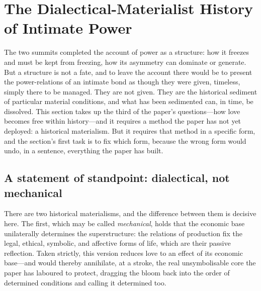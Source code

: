 \section{The Dialectical-Materialist History of Intimate Power}
\label{p17:sec:histmat}

\noindent
The two summits completed the account of power as a structure: how it freezes and must be kept from freezing, how its asymmetry can dominate or generate. But a structure is not a fate, and to leave the account there would be to present the power-relations of an intimate bond as though they were given, timeless, simply there to be managed. They are not given. They are the historical sediment of particular material conditions, and what has been sedimented can, in time, be dissolved. This section takes up the third of the paper's questions---how love becomes free within history---and it requires a method the paper has not yet deployed: a historical materialism. But it requires that method in a specific form, and the section's first task is to fix which form, because the wrong form would undo, in a sentence, everything the paper has built.

\subsection{A statement of standpoint: dialectical, not mechanical}
\label{p17:sub:histmat-standpoint}

There are two historical materialisms, and the difference between them is decisive here. The first, which may be called \emph{mechanical}, holds that the economic base unilaterally determines the superstructure: the relations of production fix the legal, ethical, symbolic, and affective forms of life, which are their passive reflection. Taken strictly, this version reduces love to an effect of its economic base---and would thereby annihilate, at a stroke, the real unsymbolisable core the paper has laboured to protect, dragging the bloom back into the order of determined conditions and calling it determined too.

